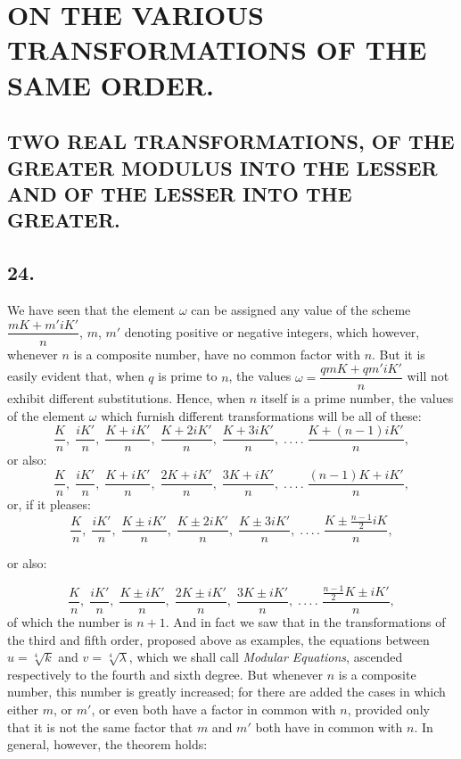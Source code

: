 \documentclass{article}
\begin{document}
\section*{ON THE VARIOUS TRANSFORMATIONS OF THE SAME ORDER.}

\subsection*{TWO REAL TRANSFORMATIONS, OF THE GREATER MODULUS INTO THE LESSER AND OF THE LESSER INTO THE GREATER.}

\subsection*{24.}

We have seen that the element $\omega$ can be assigned any value of the scheme $\dfrac{mK+m'iK'}{n}$, $m$, $m'$ denoting positive or negative integers, which however, whenever $n$ is a composite number, have no common factor with $n$. But it is easily evident that, when $q$ is prime to $n$, the values $\omega=\dfrac{qmK+qm'iK'}{n}$ will not exhibit different substitutions. Hence, when $n$ itself is a prime number, the values of the element $\omega$ which furnish different transformations will be all of these:
\[
\frac{K}{n},\;\frac{iK'}{n},\;\frac{K+iK'}{n},\;\frac{K+2iK'}{n},\;\frac{K+3iK'}{n},\;.\,.\,.\,.\;\frac{K+(n-1)iK'}{n},
\]
or also:
\[
\frac{K}{n},\;\frac{iK'}{n},\;\frac{K+iK'}{n},\;\frac{2K+iK'}{n},\;\frac{3K+iK'}{n},\;.\,.\,.\,.\;\frac{(n-1)K+iK'}{n},
\]
or, if it pleases:
\[
\frac{K}{n},\;\frac{iK'}{n},\;\frac{K\pm iK'}{n},\;\frac{K\pm2iK'}{n},\;\frac{K\pm3iK'}{n},\;.\,.\,.\,.\;\frac{K\pm\frac{n-1}{2}iK}{n},
\]

or also:

\[
\frac{K}{n},\;\frac{iK'}{n},\;\frac{K\pm iK'}{n},\;\frac{2K\pm iK'}{n},\;\frac{3K\pm iK'}{n},\;.\,.\,.\,.\;\frac{\frac{n-1}{2}K\pm iK'}{n},
\]
of which the number is $n+1$. And in fact we saw that in the transformations of the third and fifth order, proposed above as examples, the equations between $u=\sqrt[4]{k}$ and $v=\sqrt[4]{\lambda}$, which we shall call \emph{Modular Equations}, ascended respectively to the fourth and sixth degree. But whenever $n$ is a composite number, this number is greatly increased; for there are added the cases in which either $m$, or $m'$, or even both have a factor in common with $n$, provided only that it is not the same factor that $m$ and $m'$ both have in common with $n$. In general, however, the theorem holds:
\end{document}
